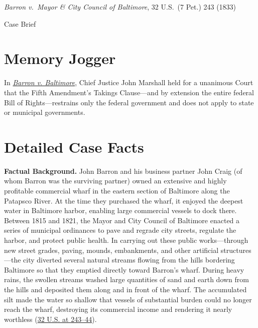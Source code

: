 \documentclass[12pt]{article}
\begin{document}
\begin{center}
{\LARGE \textit{Barron v.\ Mayor \& City Council of Baltimore}, 32 U.S.\ (7 Pet.) 243 (1833)\par}
\vspace{0.8em}
{\large Case Brief\par}
\end{center}
\vspace{1em}

\section{Memory Jogger}

In \href{https://supreme.justia.com/cases/federal/us/32/243/}{\textit{Barron v. Baltimore}}, Chief Justice John Marshall held for a unanimous Court that the Fifth Amendment's Takings Clause---and by extension the entire federal Bill of Rights---restrains only the federal government and does not apply to state or municipal governments.

\section{Detailed Case Facts}

\textbf{Factual Background.} John Barron and his business partner John Craig (of whom Barron was the surviving partner) owned an extensive and highly profitable commercial wharf in the eastern section of Baltimore along the Patapsco River. At the time they purchased the wharf, it enjoyed the deepest water in Baltimore harbor, enabling large commercial vessels to dock there. Between 1815 and 1821, the Mayor and City Council of Baltimore enacted a series of municipal ordinances to pave and regrade city streets, regulate the harbor, and protect public health. In carrying out these public works---through new street grades, paving, mounds, embankments, and other artificial structures---the city diverted several natural streams flowing from the hills bordering Baltimore so that they emptied directly toward Barron's wharf. During heavy rains, the swollen streams washed large quantities of sand and earth down from the hills and deposited them along and in front of the wharf. The accumulated silt made the water so shallow that vessels of substantial burden could no longer reach the wharf, destroying its commercial income and rendering it nearly worthless (\href{https://supreme.justia.com/cases/federal/us/32/243/}{32 U.S. at 243--44}).
\end{document}
